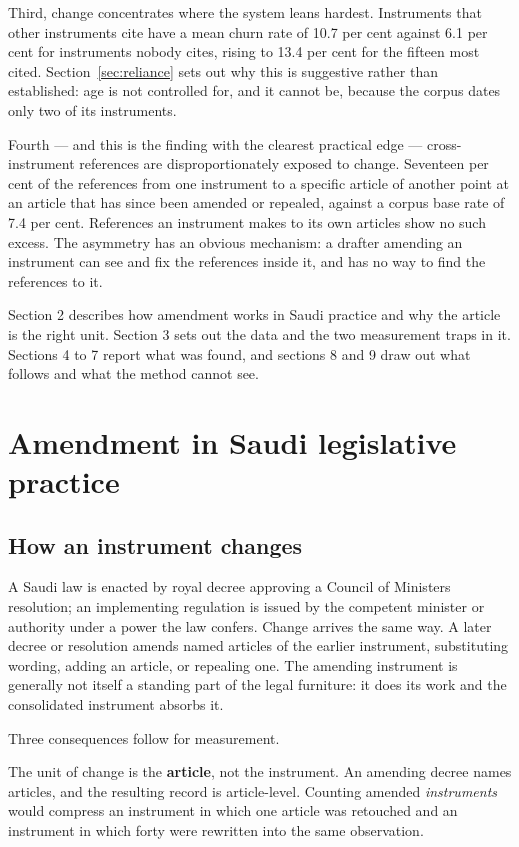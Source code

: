 \documentclass[11pt]{article}
\begin{document}
Third, change concentrates where the system leans hardest. Instruments that
other instruments cite have a mean churn rate of 10.7 per cent against 6.1
per cent for instruments nobody cites, rising to 13.4 per cent for the fifteen
most cited. Section~\ref{sec:reliance} sets out why this is suggestive rather
than established: age is not controlled for, and it cannot be, because the
corpus dates only two of its instruments.

Fourth --- and this is the finding with the clearest practical edge ---
cross-instrument references are disproportionately exposed to change.
Seventeen per cent of the references from one instrument to a specific article
of another point at an article that has since been amended or repealed,
against a corpus base rate of 7.4 per cent. References an instrument makes to
its own articles show no such excess. The asymmetry has an obvious mechanism:
a drafter amending an instrument can see and fix the references inside it,
and has no way to find the references to it.

Section 2 describes how amendment works in Saudi practice and why the article
is the right unit. Section 3 sets out the data and the two measurement traps
in it. Sections 4 to 7 report what was found, and sections 8 and 9 draw out
what follows and what the method cannot see.

\section{Amendment in Saudi legislative practice}

\subsection{How an instrument changes}

A Saudi law is enacted by royal decree approving a Council of Ministers
resolution; an implementing regulation is issued by the competent minister or
authority under a power the law confers. Change arrives the same way. A later
decree or resolution amends named articles of the earlier instrument,
substituting wording, adding an article, or repealing one. The amending
instrument is generally not itself a standing part of the legal furniture: it
does its work and the consolidated instrument absorbs it.

Three consequences follow for measurement.

The unit of change is the \textbf{article}, not the instrument. An amending
decree names articles, and the resulting record is article-level. Counting
amended \emph{instruments} would compress an instrument in which one article
was retouched and an instrument in which forty were rewritten into the same
observation.
\end{document}
